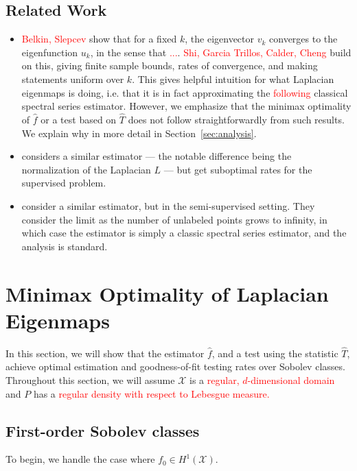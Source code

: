 \documentclass{article}
\newcommand{\1}{\mathbf{1}}
\newcommand{\mc}[1]{\mathcal{#1}}
\newcommand{\wh}[1]{\widehat{#1}}
\theoremstyle{alden}
\theoremstyle{aldenthm}
\theoremstyle{definition}
\theoremstyle{remark}
\begin{document}
\subsection{Related Work}
\begin{itemize}
	\item \textcolor{red}{Belkin, Slepcev} show that for a fixed $k$, the eigenvector $v_k$ converges to the eigenfunction $u_k$, in the sense that \textcolor{red}{...}. \textcolor{red}{Shi, Garcia Trillos, Calder, Cheng} build on this, giving finite sample bounds, rates of convergence, and making statements uniform over $k$. This gives helpful intuition for what Laplacian eigenmaps is doing, i.e. that it is in fact approximating the \textcolor{red}{following} classical spectral series estimator. However, we emphasize that the minimax optimality of $\wh{f}$ or a test based on $\wh{T}$ does not follow straightforwardly from such results. We explain why in more detail in Section~\ref{sec:analysis}.
	\item \cite{lee2016} considers a similar estimator --- the notable difference being the normalization of the Laplacian $L$ --- but get suboptimal rates for the supervised problem. 
	\item \cite{zhou2011} consider a similar estimator, but in the semi-supervised setting. They consider the limit as the number of unlabeled points grows to infinity, in which case the estimator is simply a classic spectral series estimator, and the analysis is standard. 
\end{itemize}

\section{Minimax Optimality of Laplacian Eigenmaps}
\label{sec:minimax_optimal_laplacian_eigenmaps}

In this section, we will show that the estimator $\wh{f}$, and a test using the statistic $\wh{T}$, achieve optimal estimation and goodness-of-fit testing rates over Sobolev classes. Throughout this section, we will assume $\mc{X}$ is a \textcolor{red}{regular, $d$-dimensional domain} and $P$ has a \textcolor{red}{regular density with respect to Lebesgue measure.}

\subsection{First-order Sobolev classes}
\label{sec:first_order_sobolev_classes}
To begin, we handle the case where $f_0 \in H^1(\mc{X})$.
\end{document}
